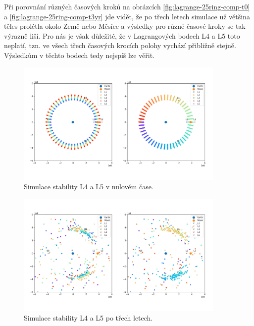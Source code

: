 \documentclass[a4paper,11pt]{article}
\begin{document}
Při porovnání různých časových kroků na obrázcích \ref{fig:lagrange-25ring-comp-t0} a \ref{fig:lagrange-25ring-comp-t3yr}
jde vidět, že po třech letech simulace už většina těles prolétla okolo Země nebo Měsíce a výsledky pro různé časové kroky se tak výrazně
liší. Pro nás je však důležité, že v Lagrangových bodech L4 a L5 toto neplatí, tzn. ve všech třech časových krocích polohy vychází přibližně stejně.
Výsledkům v těchto bodech tedy nejspíš lze věřit.

\begin{figure}[h!]
    \centering
    \includegraphics[width=0.9\textwidth]{lagrange-25ring-t0.png}

    \caption{Simulace stability L4 a L5 v nulovém čase.}
    \label{fig:lagrange-25ring-t0}
\end{figure}

\begin{figure}[h!]
    \centering
    \includegraphics[width=0.9\textwidth]{lagrange-25ring-t3yr.png}

    \caption{Simulace stability L4 a L5 po třech letech.}
    \label{fig:lagrange-25ring-t3yr}
\end{figure}
\end{document}
